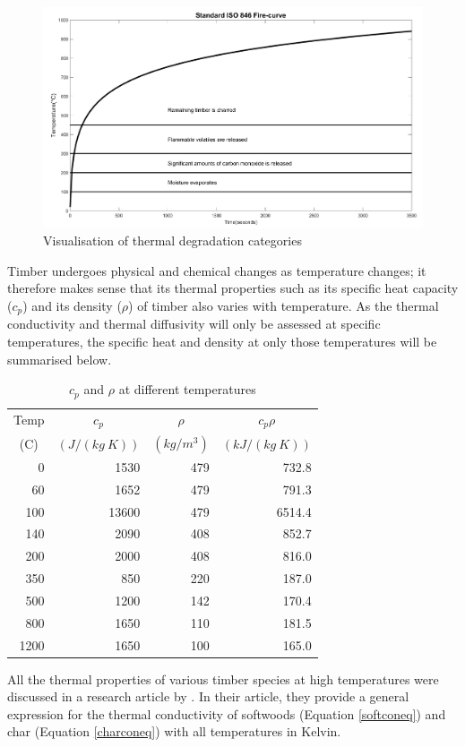\begin{figure}\label{fig:iso_phases}
\centering
\includegraphics[width = \textwidth]{figures/iso_phases.png}
\caption{Visualisation of thermal degradation categories}
\end{figure}

Timber undergoes physical and chemical changes as temperature changes; it therefore makes sense that its thermal properties such as its specific heat capacity ($c_p$) and its density ($\rho$) of timber also varies with temperature.
As the thermal conductivity and thermal diffusivity will only be assessed at specific temperatures, the specific heat and density  at only those temperatures will be summarised below.
\begin{table}\label{cptab}
\centering
\caption{$c_p$ and $\rho$ at different temperatures}
	\begin{tabular}{ r r r r }
	\toprule
	\multicolumn{1}{c}{Temp}& \multicolumn{1}{c}{$c_p$}& \multicolumn{1}{c}{$\rho$} & \multicolumn{1}{c}{$c_p\rho$}\\
	\multicolumn{1}{c}{(\textdegree C)} & \multicolumn{1}{c}{$(J/(kg\ K))$} &  \multicolumn{1}{c}{$(kg/m^3)$} & \multicolumn{1}{c}{$(kJ/(kg\ K))$}\\
	\midrule
	0   & 1530 & 479&732.8\\
	60  &1652	& 479&791.3\\
	100 &13600& 479&6514.4\\
 	140 &2090 &408&852.7\\
	200 & 2000&408&816.0\\
	350 & 850 &220&187.0\\
	500 & 1200 &142&170.4\\
	800 & 1650&110&181.5\\
	1200& 1650 &100&165.0\\
	\bottomrule
	\end{tabular}
	
\end{table}
All the thermal properties of various timber species at high temperatures were discussed in a research article by \citet{Shi:2021}.
 In their article, they provide a general expression for the thermal conductivity of softwoods (Equation \ref{softconeq}) and char (Equation \ref{charconeq}) with all temperatures in Kelvin.


